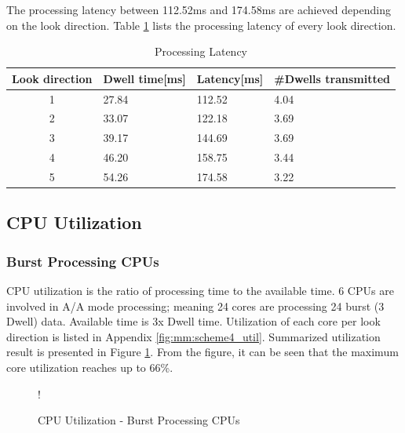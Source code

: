 The processing latency between 112.52ms and 174.58ms are achieved depending on the look direction. Table \ref{tbl:mm:scheme4_latency} lists the processing latency of every look direction.
\begin{table}[h!]
	\centering
	\begin{tabular}{|c|l|l|l|} 
	 \hline
	 \textbf{Look direction} & \textbf{Dwell time[ms]} & \textbf{Latency[ms]} & \textbf{\#Dwells transmitted} \\
	 \hline
	 1 & 27.84 & 112.52 & 4.04 \\ \hline
	 2 & 33.07 & 122.18 & 3.69 \\ \hline
	 3 & 39.17 & 144.69 & 3.69 \\ \hline
	 4 & 46.20 & 158.75 & 3.44 \\ \hline
	 5 & 54.26 & 174.58 & 3.22 \\ \hline
	\end{tabular}
	\caption{Processing Latency}
	\label{tbl:mm:scheme4_latency}
\end{table}
\FloatBarrier

\subsection{CPU Utilization}
\label{ss:mm:scheme4:cpu_load}
\subsubsection{Burst Processing CPUs}
CPU utilization is the ratio of processing time to the available time. 6 CPUs are involved in A/A mode processing; meaning 24 cores are processing 24 burst (3 Dwell) data. Available time is 3x Dwell time. Utilization of each core per look direction is listed in Appendix \ref{fig:mm:scheme4_util}. Summarized utilization result is presented in Figure \ref{sch3:chrt:cpu_util}. From the figure, it can be seen that the maximum core utilization reaches up to 66\%.
\begin{figure}[h!]
\centering
\resizebox {10cm} {!} {
}
\caption{CPU Utilization - Burst Processing CPUs}
\label{sch3:chrt:cpu_util}
\end{figure}	
	

